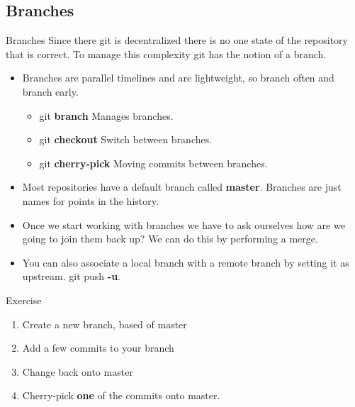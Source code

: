 \documentclass{beamer}
\begin{document}
\subsection{Branches}
\begin{frame}[fragile]{Branches}
  Since there git is decentralized there is no one state of the repository that is correct. To manage this complexity git has the notion of a branch. 
  \begin{itemize}
    \item Branches are parallel timelines and are lightweight, so branch often and branch early.
  \begin{block}{}
    \begin{itemize}
      \item git \textbf{branch}  Manages branches. 
      \item git \textbf{checkout} Switch between branches.
      \item git \textbf{cherry-pick} Moving commits between branches.
    \end{itemize}
  \end{block}
    \item Most repositories have a default branch called \textbf{master}. Branches are just names for points in the history.
    \item Once we start working with branches we have to ask ourselves how are we going to join them back up? We can do this by performing a merge.

    \item You can also associate a local branch with a remote branch by setting it as upstream. git push \textbf{-u}.
  \end{itemize}
\end{frame}
\begin{frame}
  \begin{block}{Exercise}
    \begin{enumerate}
      \item Create a new branch, based of master
      \item Add a few commits to your branch
      \item Change back onto master
      \item Cherry-pick \textbf{one} of the commits onto master.
    \end{enumerate}
  \end{block}
\end{frame}
\end{document}
